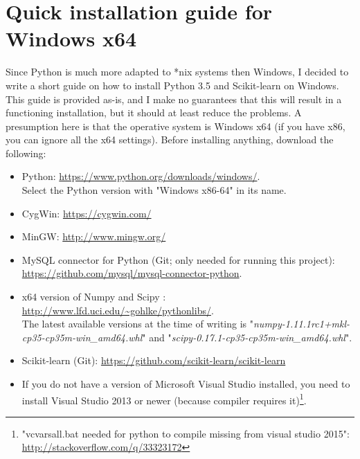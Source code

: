 \section{Quick installation guide for Windows x64}
\label{app:installation_windows}
Since Python is much more adapted to *nix systems then Windows, I decided to write a short guide on how to install Python 3.5 and Scikit-learn on Windows. 
This guide is provided as-is, and I make no guarantees that this will result in a functioning installation, but it should at least reduce the problems. 
A presumption here is that the operative system is Windows x64 (if you have x86, you can ignore all the x64 settings).
Before installing anything, download the following:
\begin{itemize}
	\item Python: \url{https://www.python.org/downloads/windows/}. \\
	Select the Python version with "Windows x86-64" in its name.
	\item CygWin: \url{https://cygwin.com/}
	\item MinGW: \url{http://www.mingw.org/}
	\item MySQL connector for Python (Git; only needed for running this project): \\
	\url{https://github.com/mysql/mysql-connector-python}.
	\item x64 version of Numpy and Scipy \cite{Codementor.io2015,Gehrcke2015}: \\ 
	\url{http://www.lfd.uci.edu/~gohlke/pythonlibs/}. \\ 
	The latest available versions at the time of writing is "\emph{numpy-1.11.1rc1+mkl-cp35-cp35m-win\_amd64.whl}" and "\emph{scipy-0.17.1-cp35-cp35m-win\_amd64.whl}".
	\item Scikit-learn (Git): \url{https://github.com/scikit-learn/scikit-learn}
	\item If you do not have a version of Microsoft Visual Studio installed, you need to install Visual Studio 2013 or newer (because compiler requires it)\footnote{
		"vcvarsall.bat needed for python to compile missing from visual studio 2015": \\
		\url{http://stackoverflow.com/q/33323172}
	}.
\end{itemize}
